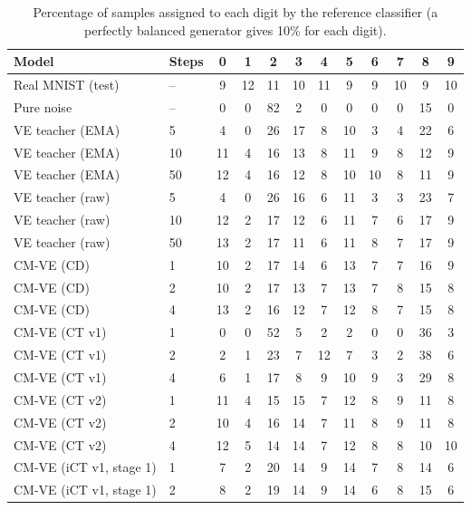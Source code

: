 \documentclass{article}
\begin{document}
\begin{table}[H]
  \caption{Percentage of samples assigned to each digit by the reference
  classifier (a perfectly balanced generator gives 10\% for each digit).}
  \label{tab:digits}
  \centering
  \footnotesize
  \setlength{\tabcolsep}{4pt}
  \begin{tabular}{llcccccccccc}
    \toprule
    Model & Steps & 0 & 1 & 2 & 3 & 4 & 5 & 6 & 7 & 8 & 9 \\
    \midrule
    Real MNIST (test) & -- & 9 & 12 & 11 & 10 & 11 & 9 & 9 & 10 & 9 & 10 \\
    Pure noise & -- & 0 & 0 & 82 & 2 & 0 & 0 & 0 & 0 & 15 & 0 \\
    \midrule
    VE teacher (EMA) & 5 & 4 & 0 & 26 & 17 & 8 & 10 & 3 & 4 & 22 & 6 \\
    VE teacher (EMA) & 10 & 11 & 4 & 16 & 13 & 8 & 11 & 9 & 8 & 12 & 9 \\
    VE teacher (EMA) & 50 & 12 & 4 & 16 & 12 & 8 & 10 & 10 & 8 & 11 & 9 \\
    VE teacher (raw) & 5 & 4 & 0 & 26 & 16 & 6 & 11 & 3 & 3 & 23 & 7 \\
    VE teacher (raw) & 10 & 12 & 2 & 17 & 12 & 6 & 11 & 7 & 6 & 17 & 9 \\
    VE teacher (raw) & 50 & 13 & 2 & 17 & 11 & 6 & 11 & 8 & 7 & 17 & 9 \\
    \midrule
    CM-VE (CD) & 1 & 10 & 2 & 17 & 14 & 6 & 13 & 7 & 7 & 16 & 9 \\
    CM-VE (CD) & 2 & 10 & 2 & 17 & 13 & 7 & 13 & 7 & 8 & 15 & 8 \\
    CM-VE (CD) & 4 & 13 & 2 & 16 & 12 & 7 & 12 & 8 & 7 & 15 & 8 \\
    \midrule
    CM-VE (CT v1) & 1 & 0 & 0 & 52 & 5 & 2 & 2 & 0 & 0 & 36 & 3 \\
    CM-VE (CT v1) & 2 & 2 & 1 & 23 & 7 & 12 & 7 & 3 & 2 & 38 & 6 \\
    CM-VE (CT v1) & 4 & 6 & 1 & 17 & 8 & 9 & 10 & 9 & 3 & 29 & 8 \\
    \midrule
    CM-VE (CT v2) & 1 & 11 & 4 & 15 & 15 & 7 & 12 & 8 & 9 & 11 & 8 \\
    CM-VE (CT v2) & 2 & 10 & 4 & 16 & 14 & 7 & 11 & 8 & 9 & 11 & 8 \\
    CM-VE (CT v2) & 4 & 12 & 5 & 14 & 14 & 7 & 12 & 8 & 8 & 10 & 10 \\
    \midrule
    CM-VE (iCT v1, stage 1) & 1 & 7 & 2 & 20 & 14 & 9 & 14 & 7 & 8 & 14 & 6 \\
    CM-VE (iCT v1, stage 1) & 2 & 8 & 2 & 19 & 14 & 9 & 14 & 6 & 8 & 15 & 6 \\

\end{tabular}
\end{table}
\end{document}
